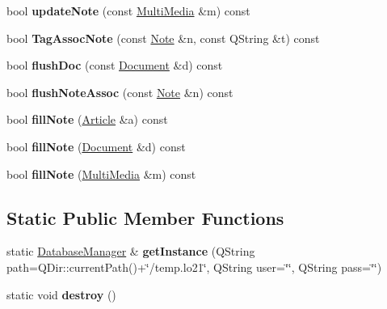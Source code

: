 \begin{DoxyCompactItemize}
\item 
\hypertarget{class_database_manager_abe7f623b96b8bbd5b72f2c0bdd11d40b}{bool {\bfseries update\-Note} (const \hyperlink{class_multi_media}{Multi\-Media} \&m) const }\label{class_database_manager_abe7f623b96b8bbd5b72f2c0bdd11d40b}

\item 
\hypertarget{class_database_manager_ade4151d081de414a0c8ed7cd36a5032a}{bool {\bfseries Tag\-Assoc\-Note} (const \hyperlink{class_note}{Note} \&n, const Q\-String \&t) const }\label{class_database_manager_ade4151d081de414a0c8ed7cd36a5032a}

\item 
\hypertarget{class_database_manager_a31c2247f473293824570876fa7623291}{bool {\bfseries flush\-Doc} (const \hyperlink{class_document}{Document} \&d) const }\label{class_database_manager_a31c2247f473293824570876fa7623291}

\item 
\hypertarget{class_database_manager_ad0725b642eb37fa4d0ca0b0bed7683e3}{bool {\bfseries flush\-Note\-Assoc} (const \hyperlink{class_note}{Note} \&n) const }\label{class_database_manager_ad0725b642eb37fa4d0ca0b0bed7683e3}

\item 
\hypertarget{class_database_manager_a1df802cba027faf8c465fe9b79ac8b98}{bool {\bfseries fill\-Note} (\hyperlink{class_article}{Article} \&a) const }\label{class_database_manager_a1df802cba027faf8c465fe9b79ac8b98}

\item 
\hypertarget{class_database_manager_a8121dee650003b03b9fddab7fe71320f}{bool {\bfseries fill\-Note} (\hyperlink{class_document}{Document} \&d) const }\label{class_database_manager_a8121dee650003b03b9fddab7fe71320f}

\item 
\hypertarget{class_database_manager_ad9dbf6c671ae44e3dc5c927c94c8f667}{bool {\bfseries fill\-Note} (\hyperlink{class_multi_media}{Multi\-Media} \&m) const }\label{class_database_manager_ad9dbf6c671ae44e3dc5c927c94c8f667}

\end{DoxyCompactItemize}
\subsection*{Static Public Member Functions}
\begin{DoxyCompactItemize}
\item 
\hypertarget{class_database_manager_ad998f5de5416534ee875b10fe1dcac82}{static \hyperlink{class_database_manager}{Database\-Manager} \& {\bfseries get\-Instance} (Q\-String path=Q\-Dir\-::current\-Path()+\char`\"{}/temp.\-lo21\char`\"{}, Q\-String user=\char`\"{}\char`\"{}, Q\-String pass=\char`\"{}\char`\"{})}\label{class_database_manager_ad998f5de5416534ee875b10fe1dcac82}

\item 
\hypertarget{class_database_manager_af3327202d4a70cd119b300bfc6b759e2}{static void {\bfseries destroy} ()}\label{class_database_manager_af3327202d4a70cd119b300bfc6b759e2}

\end{DoxyCompactItemize}



